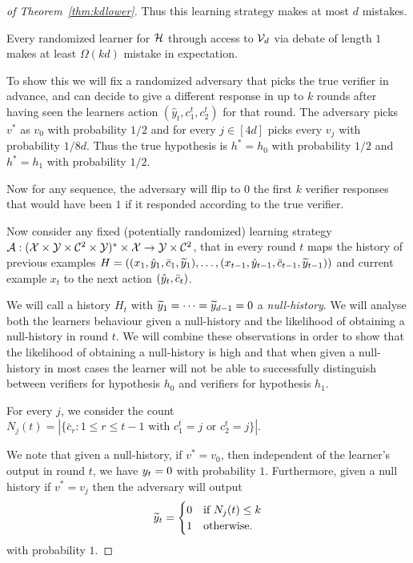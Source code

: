 \documentclass[anon]{alt2027} %
\begin{document}
\begin{proof}[of Theorem~\ref{thm:kdlower}]
Thus this learning strategy makes at most $d$ mistakes.

\begin{claim}
    Every randomized learner for ${{\mathcal H}}$ through access to ${\mathcal V}_d$ via debate of length $1$ makes at least $\Omega(kd)$ mistake in expectation. 
\end{claim}

To show this we will fix a randomized adversary that picks the true verifier in advance, and can decide to give a different response in up to $k$ rounds after having seen the learners action $(\hat{y}_t, c_1^t, c_2^t)$ for that round. 
The adversary picks $v^*$ as $v_0$ with probability $1/2$ and for every $j\in [4d]$ picks every $v_j$ with probability $1/8d$.
Thus the true hypothesis is $h^* = h_0$ with probability $1/2$ and $h^* = h_1$ with probability $1/2$.

Now for any sequence, the adversary will flip to $0$ the first $k$ verifier responses that would have been $1$ if it responded according to the true verifier. 


Now consider any fixed (potentially randomized) learning  strategy $\mathcal{A}: ({\mathcal X} \times {\mathcal Y}\times {{\mathcal C}}^2 \times {\mathcal Y})^*\times {\mathcal X} \to {\mathcal Y} \times {{\mathcal C}}^2$, that in every round $t$ maps the history of previous examples $H = ((x_1, {\hat{y}}_1, \bar{c}_1, {\widetilde{y}}_1 ), \dots, (x_{t-1}, {\hat{y}}_{t-1}, \bar{c}_{t-1}, {\widetilde{y}}_{t-1} ))$ and current example $x_t$ to the next action $({\hat{y}}_t, \bar{c}_t)$.

We will call a history $H_{t}$ with ${\widetilde{y}}_1 = \dots  = {\widetilde{y}}_{d-1} = 0$ a \emph{null-history}. We will analyse both the learners behaviour given a null-history and the likelihood of obtaining a null-history in round $t$. We will combine these observations in order to show that the likelihood of obtaining a null-history is high and that when given a null-history in most cases the learner will not be able to successfully distinguish between verifiers for hypothesis $h_0$ and verifiers for hypothesis $h_1$.

For every $j$, we consider the count $N_j(t) = |\{\bar{c}_r: 1\leq r \leq t-1 \text{ with } c_1^t=j \text{ or } c_2^t=j\}|$.

We note that given a null-history, if $v^* = v_0$, then independent of the learner's output in round $t$, we have $y_t = 0$ with probability $1$.
Furthermore, given a null history if $v^* = v_j$ then the adversary will output
\[ {\widetilde{y}}_t = \begin{cases}
    0 &\text{if } N_{j}(t) \leq k \\
        1 &\text{otherwise.}
\end{cases}\]
with probability $1$.


\end{proof}
\end{document}
